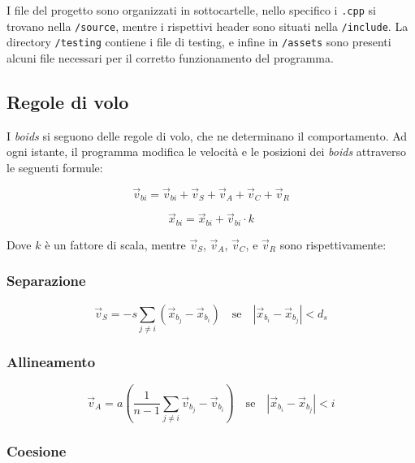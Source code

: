 \documentclass[10pt,a4paper]{article}
\begin{document}
I file del progetto sono organizzati in sottocartelle, nello specifico i \texttt{.cpp} si trovano nella \texttt{/source}, mentre i rispettivi header sono situati nella \texttt{/include}. La directory \texttt{/testing} contiene i file di testing, e infine in \texttt{/assets} sono presenti alcuni file necessari per il corretto funzionamento del programma. 

\subsection{Regole di volo}

I \textit{boids} si seguono delle regole di volo, che ne determinano il comportamento. Ad ogni istante, il programma modifica le velocità e le posizioni dei \textit{boids} attraverso le seguenti formule:

\begin{equation*}
    \vec{v}_{bi} = \vec{v}_{bi} + \vec{v}_S + \vec{v}_A + \vec{v}_C + \vec{v}_R
\end{equation*}

\begin{equation*}
    \vec{x}_{bi} = \vec{x}_{bi} + \vec{v}_{bi} \cdot k
\end{equation*}

Dove $k$ è un fattore di scala, mentre $\vec{v}_S$, $\vec{v}_A$, $\vec{v}_C$, e $\vec{v}_R$ sono rispettivamente:

\subsubsection{Separazione}

\begin{equation*}
    \vec{v}_S = -s \sum_{j \neq i} (\vec{x}_{b_j} - \vec{x}_{b_i}) \quad \text{se} \quad \left| \vec{x}_{b_i} - \vec{x}_{b_j} \right| < d_s
\end{equation*}

\subsubsection{Allineamento}

\begin{equation*}
    \vec{v}_A = a \left( \frac{1}{n-1} \sum_{j \neq i} \vec{v}_{b_j} - \vec{v}_{b_i} \right) \quad \text{se} \quad \left| \vec{x}_{b_i} - \vec{x}_{b_j} \right| < i
\end{equation*}

\subsubsection{Coesione}
\end{document}
